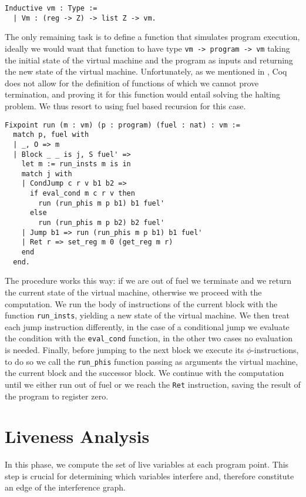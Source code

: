 \begin{lstlisting}[style=Coq]
Inductive vm : Type :=
  | Vm : (reg -> Z) -> list Z -> vm.
\end{lstlisting}

The only remaining task is to define a function that simulates program execution, ideally we would want that function to have type \texttt{vm -> program -> vm} taking the initial state of the virtual machine and the program as inputs and returning the new state of the virtual machine.
Unfortunately, as we mentioned in , Coq does not allow for the definition of functions of which we cannot prove termination, and proving it for this function would entail solving the halting problem. We thus resort to using fuel based recursion for this case.

\begin{lstlisting}[style=Coq]
Fixpoint run (m : vm) (p : program) (fuel : nat) : vm :=
  match p, fuel with
  | _, O => m
  | Block _ _ is j, S fuel' =>
    let m := run_insts m is in
    match j with
    | CondJump c r v b1 b2 =>
      if eval_cond m c r v then
        run (run_phis m p b1) b1 fuel'
      else
        run (run_phis m p b2) b2 fuel'
    | Jump b1 => run (run_phis m p b1) b1 fuel'
    | Ret r => set_reg m 0 (get_reg m r)
    end
  end.
\end{lstlisting}

The procedure works this way: if we are out of fuel we terminate and we return the current state of the virtual machine, otherwise we proceed with the computation.
We run the body of instructions of the current block with the function \texttt{run\_insts}, yielding a new state of the virtual machine. We then treat each jump instruction differently, in the case of a conditional jump we evaluate the condition with the \texttt{eval\_cond} function, in the other two cases no evaluation is needed. Finally, before jumping to the next block we execute its $\phi$-instructions, to do so we call the \texttt{run\_phis} function  passing as arguments the virtual machine, the current block and the successor block.
We continue with the computation until we either run out of fuel or we reach the \texttt{Ret} instruction, saving the result of the program to register zero.

\section{Liveness Analysis}
\label{sec:liveness}

In this phase, we compute the set of live variables at each program point. This step is crucial for determining which variables interfere and, therefore constitute an edge of the interference graph.

